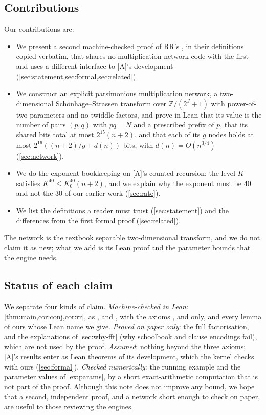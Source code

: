 \documentclass[10pt]{amsart}
\theoremstyle{plain}
\theoremstyle{definition}
\theoremstyle{remark}
\numberwithin{equation}{section}
\newcommand{\A}{\textup{[A]}}
\newcommand{\Z}{\mathbb{Z}}
\begin{document}
\subsection{Contributions}
Our contributions are:
\begin{itemize}
\item We present a second machine-checked proof of RR's , in their
definitions copied verbatim, that shares no multiplication-network code with the first and uses a
different interface to \A's development (\cref{sec:statement,sec:formal,sec:related}).
\item We construct an explicit parsimonious multiplication network, a two-dimensional
Sch\"onhage--Strassen transform over $\Z/(2^J+1)$ with power-of-two parameters and no twiddle factors,
and prove in Lean that its value is the number of pairs $(p,q)$ with $pq=N$ and a prescribed prefix of
$p$, that its shared bits total at most $2^{15}(n+2)$, and that each of its $g$ nodes holds at most
$2^{16}((n+2)/g+d(n))$ bits, with $d(n)=O(n^{3/4})$ (\cref{sec:network}).
\item We do the exponent bookkeeping on \A's counted recursion: the level $K$ satisfies
$K^{40}\le K_0^{40}(n+2)$, and we explain why the exponent must be $40$ and not the $30$ of our earlier
work (\cref{sec:rate}).
\item We list the definitions a reader must trust (\cref{sec:statement}) and the differences from the
first formal proof (\cref{sec:related}).
\end{itemize}
The network is the textbook separable two-dimensional transform, and we do not claim it as new; what
we add is its Lean proof and the parameter bounds that the engine needs.

\subsection{Status of each claim}
We separate four kinds of claim. \emph{Machine-checked in Lean}: \cref{thm:main,cor:conj,cor:rr}, as
,  and
, with the axioms ,  and
 only, and every lemma of ours whose Lean name we give.
\emph{Proved on paper only}: the full factorisation, and the explanations of
\cref{sec:why-fft} (why schoolbook and clause encodings fail), which are not used by the proof.
\emph{Assumed}: nothing beyond the three axioms;
 \A's results enter as Lean theorems of its development,
which the kernel checks with ours (\cref{sec:formal}). \emph{Checked numerically}: the running example
and the parameter values of \cref{ex:params}, by a short exact-arithmetic computation that is not part of
the proof. Although this note does not improve any bound, we hope that a second, independent proof, and
a network short enough to check on paper, are useful to those reviewing the engines.
\end{document}
